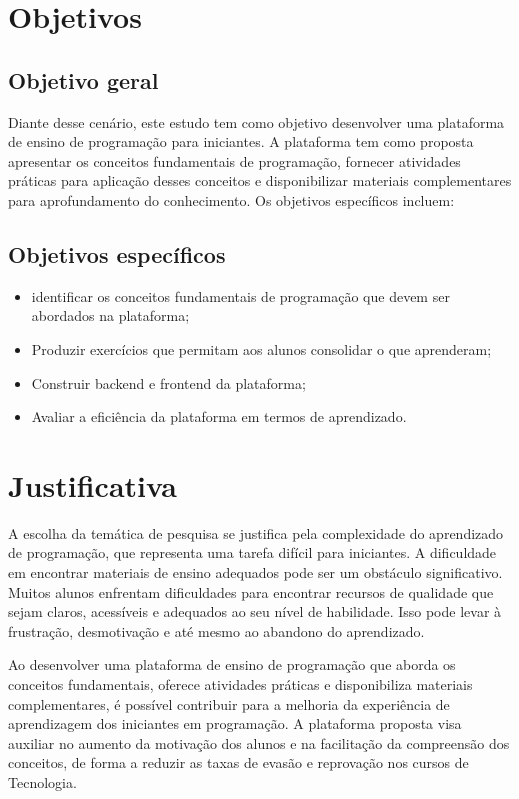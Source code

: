 
\section{Objetivos}

    \subsection{Objetivo geral}
    Diante desse cenário, este estudo tem como objetivo desenvolver uma plataforma de ensino de programação para iniciantes. A plataforma tem como proposta apresentar os conceitos fundamentais de programação, fornecer atividades práticas para aplicação desses conceitos e disponibilizar materiais complementares para aprofundamento do conhecimento. Os objetivos específicos incluem:
    
    \subsection{Objetivos específicos}
    
        \begin{itemize}
            \item identificar os conceitos fundamentais de programação que devem ser abordados na plataforma;
            \item Produzir exercícios que permitam aos alunos consolidar o que aprenderam;
            \item Construir backend e frontend da plataforma;
            \item Avaliar a eficiência da plataforma em termos de aprendizado.
        \end{itemize}


\section{Justificativa}
A escolha da temática de pesquisa se justifica pela complexidade do aprendizado de programação, que representa uma tarefa difícil para iniciantes. A dificuldade em encontrar materiais de ensino adequados pode ser um obstáculo significativo. Muitos alunos enfrentam dificuldades para encontrar recursos de qualidade que sejam claros, acessíveis e adequados ao seu nível de habilidade. Isso pode levar à frustração, desmotivação e até mesmo ao abandono do aprendizado.

Ao desenvolver uma plataforma de ensino de programação que aborda os conceitos fundamentais, oferece atividades práticas e disponibiliza materiais complementares, é possível contribuir para a melhoria da experiência de aprendizagem dos iniciantes em programação. A plataforma proposta visa auxiliar no aumento da motivação dos alunos e na facilitação da compreensão dos conceitos, de forma a reduzir as taxas de evasão e reprovação nos cursos de Tecnologia.

